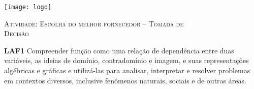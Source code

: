 \documentclass[10 pt,usenames,dvipsnames, oneside]{article}
\begin{document}
\begin{center}
  \begin{minipage}[l]{3cm}
\texttt{[image: logo]}    
\end{minipage}\hfill
\begin{minipage}[r]{.8\textwidth}
 {\Large \scshape Atividade: Escolha do melhor fornecedor -- Tomada de \\ Decisão}  
\end{minipage}
\end{center}
\vspace{.2cm}

\ifdefined\prof
\begin{objetivos}
\item \textbf{LAF1} Compreender função como uma relação de dependência entre duas variáveis, as ideias de domínio, contradomínio e imagem, e suas representações algébricas e gráficas e utilizá-las para analisar, interpretar e resolver problemas em contextos diversos, inclusive fenômenos naturais, sociais e de outras áreas.
\end{objetivos}
\end{document}
